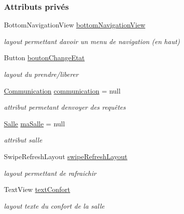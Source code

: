 \subsubsection*{Attributs privés}
\begin{DoxyCompactItemize}
\item 
Bottom\+Navigation\+View \hyperlink{classcom_1_1lasalle_1_1meeting_1_1_salle_activity_a43f122362683c363d7eee1b1f1dfd581}{bottom\+Navigation\+View}
\begin{DoxyCompactList}\small\item\em layout permettant d\textquotesingle{}avoir un menu de navigation (en haut) \end{DoxyCompactList}\item 
Button \hyperlink{classcom_1_1lasalle_1_1meeting_1_1_salle_activity_a0c33eac55429431e84849eca22ad3916}{bouton\+Change\+Etat}
\begin{DoxyCompactList}\small\item\em layout du prendre/liberer \end{DoxyCompactList}\item 
\hyperlink{classcom_1_1lasalle_1_1meeting_1_1_communication}{Communication} \hyperlink{classcom_1_1lasalle_1_1meeting_1_1_salle_activity_ab57d7397514ed7256304b0784f8ea7bf}{communication} = null
\begin{DoxyCompactList}\small\item\em attribut permetant d\textquotesingle{}envoyer des requêtes \end{DoxyCompactList}\item 
\hyperlink{classcom_1_1lasalle_1_1meeting_1_1_salle}{Salle} \hyperlink{classcom_1_1lasalle_1_1meeting_1_1_salle_activity_a7ae6e92ee66fa15d999f166f40738648}{ma\+Salle} = null
\begin{DoxyCompactList}\small\item\em attribut salle \end{DoxyCompactList}\item 
Swipe\+Refresh\+Layout \hyperlink{classcom_1_1lasalle_1_1meeting_1_1_salle_activity_aa331ece163b959f06fae00a637d37cb4}{swipe\+Refresh\+Layout}
\begin{DoxyCompactList}\small\item\em layout permettant de rafraichir \end{DoxyCompactList}\item 
Text\+View \hyperlink{classcom_1_1lasalle_1_1meeting_1_1_salle_activity_a9b647a7aaf2aab7a9e74cb525c250545}{text\+Confort}
\begin{DoxyCompactList}\small\item\em layout texte du confort de la salle \end{DoxyCompactList}\item 

\end{DoxyCompactItemize}
